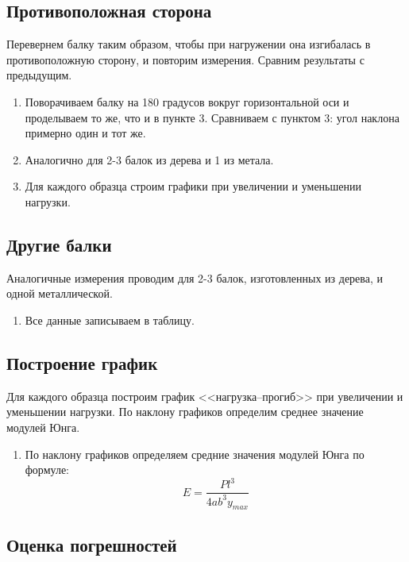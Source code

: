 \documentclass[a4paper, 12pt]{article}%
\begin{document}
\subsection{Противоположная сторона}

Перевернем балку таким образом, чтобы при нагружении она изгибалась в противоположную сторону, и повторим измерения. Сравним результаты с предыдущим.

\begin{enumerate}
\item Поворачиваем балку на 180 градусов вокруг горизонтальной оси и проделываем то же, что и в пункте 3. Сравниваем с пунктом 3:  угол наклона примерно один и тот же.  
\item Аналогично для 2-3 балок из дерева и 1 из метала. 
\item Для каждого образца строим графики при увеличении и уменьшении нагрузки.
\end{enumerate}

\subsection{Другие балки}

Аналогичные измерения проводим для 2-3 балок, изготовленных из дерева, и одной металлической.

\begin{enumerate}
\item Все данные записываем в таблицу. 
\end{enumerate}

\subsection{Построение график}

Для каждого образца построим график <<нагрузка--прогиб>> при увеличении и уменьшении нагрузки. По наклону графиков определим среднее значение модулей Юнга.

\begin{enumerate}
\item По наклону графиков определяем средние значения модулей Юнга по формуле:
\[E = \dfrac{Pl^3}{4ab^3y_{max}}\]
\end{enumerate}



\subsection{Оценка погрешностей}
\end{document}

